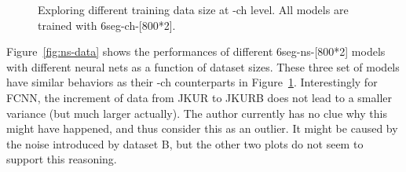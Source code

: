 \begin{figure}[htb]
	\caption{Exploring different training data size at -ch level. All models are trained with 6seg-ch-[800*2].}
	\label{fig:ch-data}
\end{figure}

Figure~\ref{fig:ns-data} shows the performances of different 6seg-ns-[800*2] models with different neural nets as a function of dataset sizes. These three set of models have similar behaviors as their -ch counterparts in Figure~\ref{fig:ch-data}. Interestingly for FCNN, the increment of data from JKUR to JKURB does not lead to a smaller variance (but much larger actually). The author currently has no clue why this might have happened, and thus consider this as an outlier. It might be caused by the noise introduced by dataset B, but the other two plots do not seem to support this reasoning.

